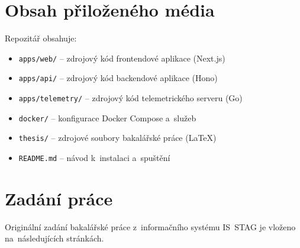 \chapter{Obsah přiloženého média}
\label{app:medium}


\noindent Repozitář obsahuje:
\begin{itemize}
    \item \texttt{apps/web/} -- zdrojový kód frontendové aplikace (Next.js)
    \item \texttt{apps/api/} -- zdrojový kód backendové aplikace (Hono)
    \item \texttt{apps/telemetry/} -- zdrojový kód telemetrického serveru (Go)
    \item \texttt{docker/} -- konfigurace Docker Compose a~služeb
    \item \texttt{thesis/} -- zdrojové soubory bakalářské práce (\LaTeX)
    \item \texttt{README.md} -- návod k~instalaci a~spuštění
\end{itemize}

\chapter{Zadání práce}
\label{app:zadani}

\noindent Originální zadání bakalářské práce z~informačního systému IS~STAG je vloženo na~následujících stránkách.


